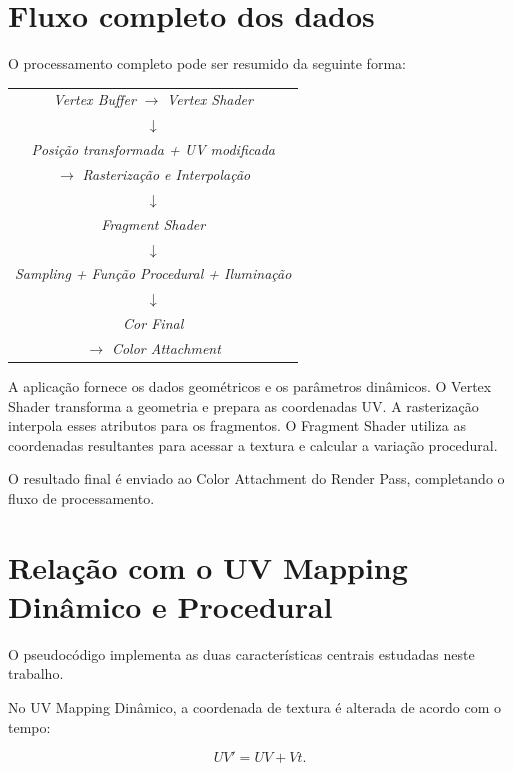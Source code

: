 \section{Fluxo completo dos dados}

O processamento completo pode ser resumido da seguinte forma:

\begin{center}
\begin{tabular}{c}
\textit{Vertex Buffer}
$\rightarrow$
\textit{Vertex Shader}
\\[0.15cm]
$\downarrow$
\\[0.15cm]
\textit{Posição transformada + UV modificada}
\\[0.15cm]
$\rightarrow$
\textit{Rasterização e Interpolação}
\\[0.15cm]
$\downarrow$
\\[0.15cm]
\textit{Fragment Shader}
\\[0.15cm]
$\downarrow$
\\[0.15cm]
\textit{Sampling + Função Procedural + Iluminação}
\\[0.15cm]
$\downarrow$
\\[0.15cm]
\textit{Cor Final}
\\[0.15cm]
$\rightarrow$
\textit{Color Attachment}
\end{tabular}
\end{center}

A aplicação fornece os dados geométricos e os parâmetros dinâmicos. O
Vertex Shader transforma a geometria e prepara as coordenadas UV. A
rasterização interpola esses atributos para os fragmentos. O Fragment Shader
utiliza as coordenadas resultantes para acessar a textura e calcular a
variação procedural.

O resultado final é enviado ao Color Attachment do Render Pass, completando
o fluxo de processamento.


\section{Relação com o UV Mapping Dinâmico e Procedural}

O pseudocódigo implementa as duas características centrais estudadas neste
trabalho.

No UV Mapping Dinâmico, a coordenada de textura é alterada de acordo com o
tempo:

\begin{equation}
UV'=UV+Vt.
\end{equation}

